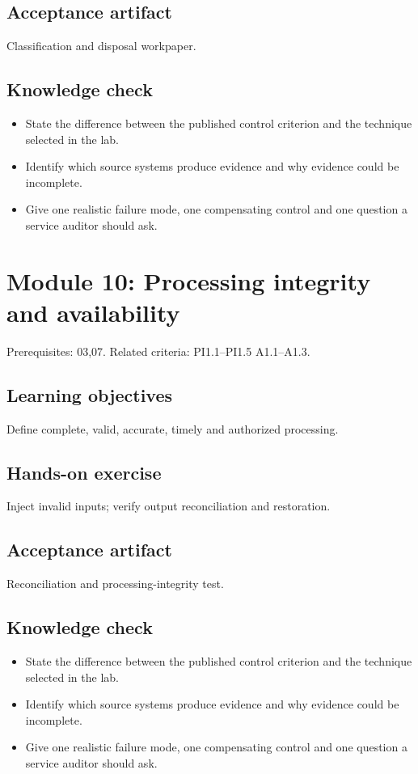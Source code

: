 \documentclass[10pt,oneside]{report}
\begin{document}
\subsection{Acceptance artifact}
Classification and disposal workpaper.

\subsection{Knowledge check}
\begin{itemize}
\item State the difference between the published control criterion and the technique selected in the lab.
\item Identify which source systems produce evidence and why evidence could be incomplete.
\item Give one realistic failure mode, one compensating control and one question a service auditor should ask.
\end{itemize}

\section{Module 10: Processing integrity and availability}
Prerequisites: 03,07. Related criteria: PI1.1--PI1.5 A1.1--A1.3.

\subsection{Learning objectives}
Define complete, valid, accurate, timely and authorized processing.

\subsection{Hands-on exercise}
Inject invalid inputs; verify output reconciliation and restoration.

\subsection{Acceptance artifact}
Reconciliation and processing-integrity test.

\subsection{Knowledge check}
\begin{itemize}
\item State the difference between the published control criterion and the technique selected in the lab.
\item Identify which source systems produce evidence and why evidence could be incomplete.
\item Give one realistic failure mode, one compensating control and one question a service auditor should ask.
\end{itemize}
\end{document}
